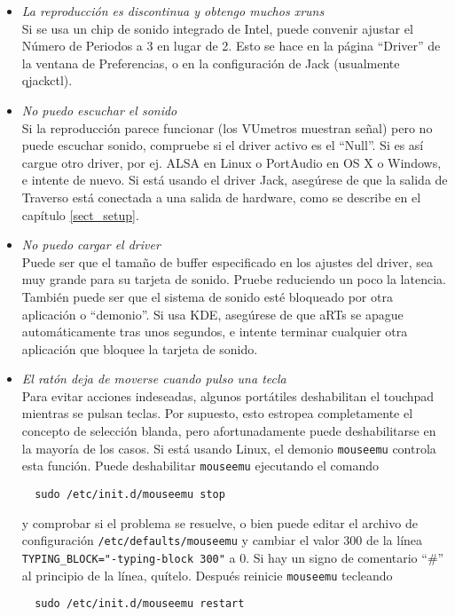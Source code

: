 ﻿\begin{itemize}
 \item \textit{La reproducción es discontinua y obtengo muchos xruns}\\
  Si se usa un chip de sonido integrado de Intel, puede convenir ajustar el Número de Periodos a 3 en lugar de 2. Esto se hace en la página ``Driver'' de la ventana de Preferencias, o en la configuración de Jack (usualmente qjackctl).  

 \item \textit{No puedo escuchar el sonido}\\
  Si la reproducción parece funcionar (los VUmetros muestran señal) pero no puede escuchar sonido, compruebe si el driver activo es el ``Null''. Si es así cargue otro driver, por ej. ALSA en Linux o PortAudio en OS X o Windows, e intente de nuevo. Si está usando el driver Jack, asegúrese de que la salida de Traverso está conectada a una salida de hardware, como se describe en el capítulo \ref{sect_setup}.

 \item \textit{No puedo cargar el driver}\\
  Puede ser que el tamaño de buffer especificado en los ajustes del driver, sea muy grande para su tarjeta de sonido. Pruebe reduciendo un poco la latencia. También puede ser que el sistema de sonido esté bloqueado por otra aplicación o ``demonio''. Si usa KDE, asegúrese de que aRTs se apague automáticamente tras unos segundos, e intente terminar cualquier otra aplicación que bloquee la tarjeta de sonido.

 \item \textit{El ratón deja de moverse cuando pulso una tecla}\\
  Para evitar acciones indeseadas, algunos portátiles deshabilitan el touchpad mientras se pulsan teclas. Por supuesto, esto estropea completamente el concepto de selección blanda, pero afortunadamente puede deshabilitarse en la mayoría de los casos. Si está usando Linux, el demonio \texttt{mouseemu} controla esta función. Puede deshabilitar \texttt{mouseemu} ejecutando el comando 
  \begin{verbatim}
  sudo /etc/init.d/mouseemu stop
  \end{verbatim}
  y comprobar si el problema se resuelve, o bien puede editar el archivo de configuración \texttt{/etc/defaults/mouseemu} y cambiar el valor 300 de la línea \texttt{TYPING\_BLOCK="-typing-block 300"} a 0. Si hay un signo de comentario ``\#'' al principio de la línea, quítelo. Después reinicie \texttt{mouseemu} tecleando
  \begin{verbatim}
  sudo /etc/init.d/mouseemu restart
  \end{verbatim}


\end{itemize}
